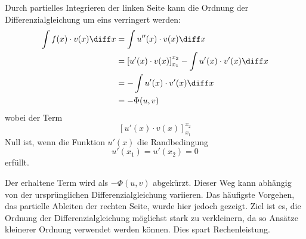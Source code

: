 Durch partielles Integrieren der linken Seite kann die Ordnung der Differenzialgleichung um eins verringert werden:
\begin{align}
    \int f(x) \cdot v(x) \diff x &= \int u''(x) \cdot v(x) \diff x \\
                                 &= \left[ u'(x) \cdot v(x) \right]_{x_1}^{x_2} - \int u'(x) \cdot v'(x) \diff x \\
                                 &= - \int u'(x) \cdot v'(x) \diff x \\
                                 &= - \Phi(u, v)
\end{align}
wobei der Term
\begin{equation}
    \left[ u'(x) \cdot v(x) \right]_{x_1}^{x_2}
\end{equation}
Null ist, wenn die Funktion $u'(x)$ die Randbedingung
\begin{equation}
    u'(x_1) = u'(x_2) = 0
\end{equation}
erfüllt. 

Der erhaltene Term wird als $-\Phi(u, v)$ abgekürzt.
Dieser Weg kann abhängig von der ursprünglichen Differenzialgleichung variieren.
Das häufigste Vorgehen, das partielle Ableiten der rechten Seite, wurde hier jedoch gezeigt.
Ziel ist es, die Ordnung der Differenzialgleichung möglichst stark zu verkleinern, da so Ansätze kleinerer Ordnung verwendet werden können.
Dies spart Rechenleistung.


